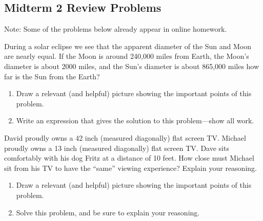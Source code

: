 \subsection{Midterm 2 Review Problems}
Note: Some of the problems below already appear in online homework.


\begin{prob}
During a solar eclipse we see that the apparent diameter of the Sun and Moon are nearly equal. If the Moon is around 240,000 miles from Earth, the Moon's diameter is about 2000 miles, and the Sun's diameter is about 865,000 miles how far is the Sun from the Earth?
\begin{enumerate}
\item Draw a relevant (and helpful) picture showing the important points of this problem.
\item Write an expression that gives the solution to this problem---show all work.
\end{enumerate}
\end{prob}

\begin{prob}
David proudly owns a 42 inch (measured diagonally) flat screen
  TV. Michael proudly owns a 13 inch (measured diagonally) flat screen
  TV. Dave sits comfortably with his dog Fritz at a distance of 10
  feet. How close must Michael sit from his TV to have the ``same''
  viewing experience?  Explain your reasoning.
\begin{enumerate}
\item Draw a relevant (and helpful) picture showing the important
  points of this problem.
\item Solve this problem, and be sure to explain your reasoning.
\end{enumerate}
\end{prob}


